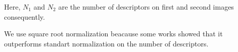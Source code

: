 \documentclass[11pt]{article} %
\begin{document}
Here, $N_1$ and $N_2$ are the number of descriptors on first and second images consequently.

We use square root normalization beacause some works\cite{jegou:inria-00602325} showed that it
outperforms standart normalization on the number of descriptors.





\end{document}
